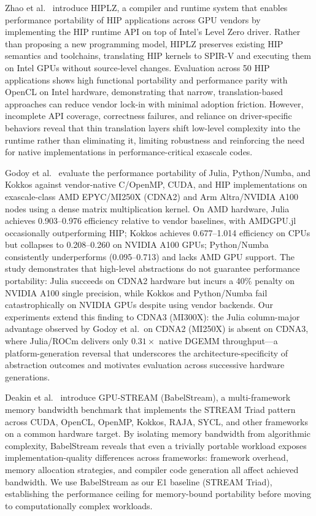 Zhao et al.~\cite{zhao2023hiplz} introduce HIPLZ, a compiler and runtime system
that enables performance portability of HIP applications across GPU vendors by
implementing the HIP runtime API on top of Intel's Level Zero driver. Rather
than proposing a new programming model, HIPLZ preserves existing HIP semantics
and toolchains, translating HIP kernels to SPIR-V and executing them on Intel
GPUs without source-level changes. Evaluation across 50 HIP applications shows
high functional portability and performance parity with OpenCL on Intel hardware,
demonstrating that narrow, translation-based approaches can reduce vendor lock-in
with minimal adoption friction. However, incomplete API coverage, correctness
failures, and reliance on driver-specific behaviors reveal that thin translation
layers shift low-level complexity into the runtime rather than eliminating it,
limiting robustness and reinforcing the need for native implementations in
performance-critical exascale codes.

Godoy et al.~\cite{Godoy2023} evaluate the performance portability of Julia,
Python/Numba, and Kokkos against vendor-native C/OpenMP, CUDA, and HIP
implementations on exascale-class AMD EPYC/MI250X (CDNA2) and Arm
Altra/NVIDIA A100 nodes using a dense matrix multiplication kernel. On AMD
hardware, Julia achieves 0.903--0.976 efficiency relative to vendor baselines,
with AMDGPU.jl occasionally outperforming HIP; Kokkos achieves 0.677--1.014
efficiency on CPUs but collapses to 0.208--0.260 on NVIDIA A100 GPUs;
Python/Numba consistently underperforms (0.095--0.713) and lacks AMD GPU
support. The study demonstrates that high-level abstractions do not guarantee
performance portability: Julia succeeds on CDNA2 hardware but incurs a 40\%
penalty on NVIDIA A100 single precision, while Kokkos and Python/Numba fail
catastrophically on NVIDIA GPUs despite using vendor backends. Our experiments
extend this finding to CDNA3 (MI300X): the Julia column-major advantage observed
by Godoy et al.\ on CDNA2 (MI250X) is absent on CDNA3, where Julia/ROCm
delivers only $0.31\times$ native DGEMM throughput---a platform-generation
reversal that underscores the architecture-specificity of abstraction outcomes
and motivates evaluation across successive hardware generations.

Deakin et al.~\cite{Deakin2019} introduce GPU-STREAM (BabelStream), a
multi-framework memory bandwidth benchmark that implements the STREAM Triad
pattern across CUDA, OpenCL, OpenMP, Kokkos, RAJA, SYCL, and other frameworks
on a common hardware target. By isolating memory bandwidth from algorithmic
complexity, BabelStream reveals that even a trivially portable workload
exposes implementation-quality differences across frameworks: framework overhead,
memory allocation strategies, and compiler code generation all affect achieved
bandwidth. We use BabelStream as our E1 baseline (STREAM Triad), establishing
the performance ceiling for memory-bound portability before moving to
computationally complex workloads.

